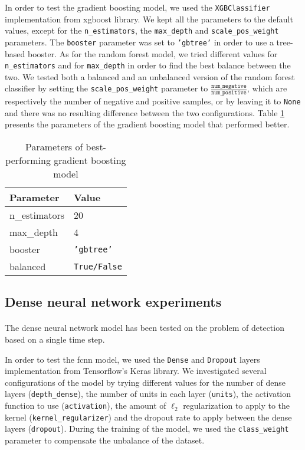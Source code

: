 In order to test the gradient boosting model, we used the \texttt{XGBClassifier} implementation from xgboost library. We kept all the parameters to the default values, except for the \texttt{n\_estimators}, the \texttt{max\_depth} and \texttt{scale\_pos\_weight} parameters. The \texttt{booster} parameter was set to \texttt{'gbtree'} in order to use a tree-based booster. As for the random forest model, we tried different values for \texttt{n\_estimators} and for \texttt{max\_depth} in order to find the best balance between the two. We tested both a balanced and an unbalanced version of the random forest classifier by setting the \texttt{scale\_pos\_weight} parameter to $\frac{\texttt{num\_negative}}{\texttt{num\_positive}}$, which are respectively the number of negative and positive samples, or by leaving it to \texttt{None} and there was no resulting difference between the two configurations. Table \ref{tab:gradientboosting_param} presents the parameters of the gradient boosting model that performed better.
\begin{table}[htbp]
    \centering
    \begin{tabular}{ll}
        \hline
        \textbf{Parameter}  & \textbf{Value} \\\hline
        n\_estimators       & 20 \\
        max\_depth          & 4 \\
        booster             & \texttt{'gbtree'} \\
        balanced            & \texttt{True/False}
    \end{tabular}
    \caption{Parameters of best-performing gradient boosting model}
    \label{tab:gradientboosting_param}
\end{table}

\subsection{Dense neural network experiments}
\paragraph{} The dense neural network model has been tested on the problem of detection based on a single time step.

In order to test the \acs{fcnn} model, we used the \texttt{Dense} and \texttt{Dropout} layers implementation from Tensorflow's Keras library. We investigated several configurations of the model by trying different values for the number of dense layers (\texttt{depth\_dense}), the number of units in each layer (\texttt{units}), the activation function to use (\texttt{activation}), the amount of $\ell_2$ regularization to apply to the kernel (\texttt{kernel\_regularizer}) and the dropout rate to apply between the dense layers (\texttt{dropout}). During the training of the model, we used the \texttt{class\_weight} parameter to compensate the unbalance of the dataset.

